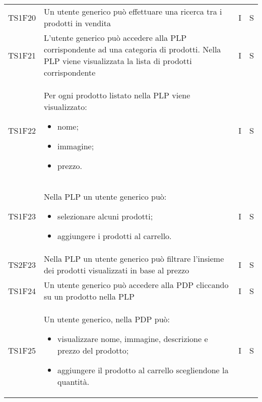 {\begin{longtable}{C{2cm} C{9.6cm} C{1.5cm} C{1cm}}
TS1F20 & Un utente generico può effettuare una ricerca tra i prodotti in vendita & I & S\\

TS1F21 & L'utente generico può accedere alla PLP corrispondente ad una categoria di prodotti. Nella PLP viene visualizzata la lista di prodotti corrispondente & I & S\\

TS1F22 & Per ogni prodotto listato nella PLP viene visualizzato:
\begin{itemize}
	\item nome;
	\item immagine;
	\item prezzo.
\end{itemize} & I & S\\

TS1F23 & Nella PLP un utente generico può:
\begin{itemize}
	\item selezionare alcuni prodotti;
	\item aggiungere i prodotti al carrello.
\end{itemize} & I & S\\

TS2F23 & Nella PLP un utente generico può filtrare l'insieme dei prodotti visualizzati in base al prezzo & I & S\\

TS1F24 & Un utente generico può accedere alla PDP cliccando su un prodotto nella PLP & I & S\\

TS1F25 & Un utente generico, nella PDP può:
\begin{itemize}
	\item visualizzare nome, immagine, descrizione e prezzo del prodotto;
	\item aggiungere il prodotto al carrello scegliendone la quantità.
\end{itemize} & I & S\\



\end{longtable}


}
